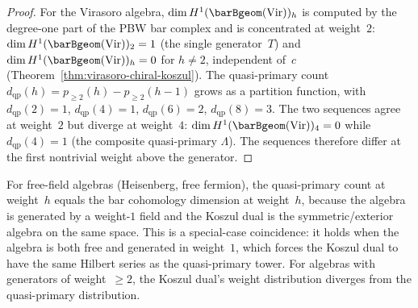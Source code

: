 \begin{proof}
For the Virasoro algebra, $\dim H^1(\barBgeom(\mathrm{Vir}))_h$
is computed by the degree-one part of the PBW bar complex and is
concentrated at weight~$2$:
$\dim H^1(\barBgeom(\mathrm{Vir}))_2 = 1$ (the single
generator~$T$) and $\dim H^1(\barBgeom(\mathrm{Vir}))_h = 0$ for
$h \neq 2$, independent of~$c$
  (Theorem~\ref{thm:virasoro-chiral-koszul}).
The quasi-primary count
$d_{\mathrm{qp}}(h) = p_{\geq 2}(h) - p_{\geq 2}(h{-}1)$
grows as a partition function, with
$d_{\mathrm{qp}}(2) = 1$, $d_{\mathrm{qp}}(4) = 1$,
$d_{\mathrm{qp}}(6) = 2$, $d_{\mathrm{qp}}(8) = 3$. The two
sequences agree at weight~$2$ but diverge at weight~$4$:
$\dim H^1(\barBgeom(\mathrm{Vir}))_4 = 0$ while
$d_{\mathrm{qp}}(4) = 1$ (the composite quasi-primary $\Lambda$).
The sequences therefore differ at the first nontrivial weight
above the generator.
\end{proof}

\begin{remark}
\label{rem:bar-quasiprimary-free-field}
For free-field algebras (Heisenberg, free fermion), the
quasi-primary count at weight~$h$ equals the bar cohomology
dimension at weight~$h$, because the algebra is generated by
a weight-$1$ field and the Koszul dual is the
symmetric/exterior algebra on the same space. This is a
special-case coincidence: it holds when the algebra is
both free and generated in weight~$1$, which forces the Koszul
dual to have the same Hilbert series as the quasi-primary tower.
For algebras with generators of weight~$\geq 2$, the Koszul
dual's weight distribution diverges from the quasi-primary
distribution.
\end{remark}

